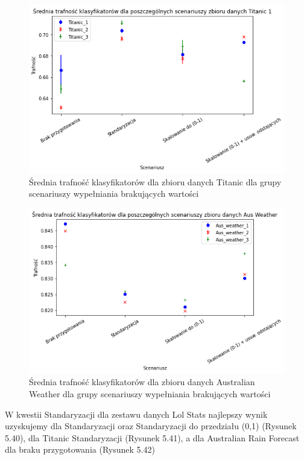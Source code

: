 \documentclass{book}
\begin{document}
\begin{figure}[H]
    \centerline{\includegraphics[scale=0.5]{Titanic_Avg_Standaryzacja}}
    \centering
    \caption{Średnia trafność klasyfikatorów dla zbioru danych Titanic 
    dla grupy scenariuszy wypełniania brakujących wartości}
    \end{figure}

\begin{figure}[H]
    \centerline{\includegraphics[scale=0.5]{Aus_Weather_Avg_Standaryzacja}}
    \centering
    \caption{Średnia trafność klasyfikatorów dla zbioru danych Australian Weather 
    dla grupy scenariuszy wypełniania brakujących wartości}
    \end{figure}

    W kwestii Standaryzacji dla zestawu danych Lol Stats 
    najlepszy wynik uzyskujemy dla Standaryzacji oraz 
    Standaryzacji do przedziału (0,1) (Rysunek 5.40), dla 
    Titanic Standaryzacji (Rysunek 5.41), a dla Australian 
    Rain Forecast dla braku przygotowania (Rysunek 5.42)
\end{document}
